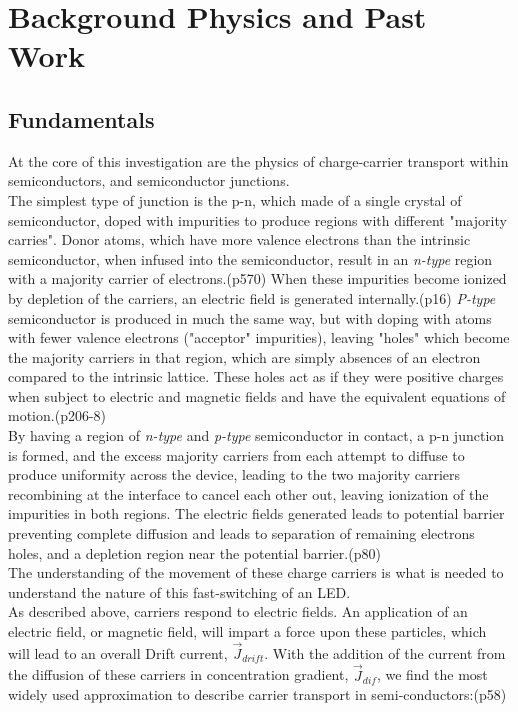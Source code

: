\documentclass[titlepage]{article}
\begin{document}
\section{Background Physics and Past Work}
\subsection{Fundamentals}
At the core of this investigation are the physics of charge-carrier transport within semiconductors, and semiconductor junctions.\\
The simplest type of junction is the p-n, which made of a single crystal of semiconductor, doped with impurities to produce regions with different "majority carries". Donor atoms, which have more valence electrons than the intrinsic semiconductor, when infused into the semiconductor, result in an \textit{n-type} region with a majority carrier of electrons.\cite{Kittel}(p570) When these impurities become ionized by depletion of the carriers, an electric field is generated internally.\cite{Sze}(p16) \textit{P-type} semiconductor is produced in much the same way, but with doping with atoms with fewer valence electrons ("acceptor" impurities), leaving "holes" which become the majority carriers in that region, which are simply absences of an electron compared to the intrinsic lattice. These holes act as if they were  positive charges when subject to electric and magnetic fields and have the equivalent equations of motion.\cite{Kittel}(p206-8)\\
By having a region of \textit{n-type} and \textit{p-type} semiconductor in contact, a p-n junction is formed, and the excess majority carriers from each attempt to diffuse to produce uniformity across the device, leading to the two majority carriers recombining at the interface to cancel each other out, leaving ionization of the impurities in both regions. The electric fields generated leads to potential barrier preventing complete diffusion and leads to separation of remaining electrons holes, and a depletion region near the potential barrier.\cite{Sze}(p80)\\
The understanding of the movement of these charge carriers is what is needed to understand the nature of this fast-switching of an LED.\\
As described above, carriers respond to electric fields. An application of an electric field, or magnetic field, will impart a force upon these particles, which will lead to an overall Drift current, $\vec{J}_{drift}$. With the addition of the current from the diffusion of these carriers in concentration gradient, $\vec{J}_{dif}$, we find the most widely used approximation to describe carrier transport in semi-conductors:\cite{SzeHiSpeed}(p58)
\end{document}
